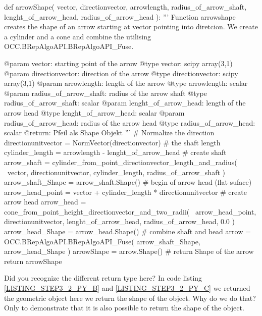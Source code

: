 \begin{python}[moreemph={[4], 46, 48},caption={Step3\_2.py - Function defining an arrow shape object from a point, a direction vector, the arrow length, the radius of the arrow shaft, the length of the arrow head and the radius of the arrow head},label=LISTING_STEP3_2_PY_D]
def arrowShape( vector, 
                directionvector,
                arrowlength,
                radius_of_arrow_shaft,
                lenght_of_arrow_head,
                radius_of_arrow_head ):
    '''
    Function arrowshape creates the shape of an arrow starting at vector
    pointing into diretcion. We create a cylinder and a cone and combine the 
    utilising OCC.BRepAlgoAPI.BRepAlgoAPI_Fuse.

    @param vector: starting point of the arrow
    @type  vector: scipy array(3,1)
    @param directionvector: direction of the arrow
    @type  directionvector: scipy  array(3,1)
    @param arrowlength: length of the arrow
    @type  arrowlength: scalar
    @param radius_of_arrow_shaft: radius of the arrow shaft
    @type  radius_of_arrow_shaft: scalar
    @param lenght_of_arrow_head: length of the arrow head
    @type  lenght_of_arrow_head: scalar
    @param radius_of_arrow_head: radius of the arrow head
    @type  radius_of_arrow_head: scalar
    @return: Pfeil als Shape Objekt
    '''
    # Normalize the direction
    directionunitvector = NormVector(directionvector)
    # the shaft length
    cylinder_length = arrowlength - lenght_of_arrow_head
    # create shaft
    arrow_shaft = cylinder_from_point_directionvector_length_and_radius( \
                                                    vector, 
                                                    directionunitvector,
                                                    cylinder_length,
                                                    radius_of_arrow_shaft ) 
    arrow_shaft_Shape = arrow_shaft.Shape()
    # begin of arrow head (flat suface)
    arrow_head_point = vector + cylinder_length * directionunitvector
    # create arrow head
    arrow_head = cone_from_point_height_directionvector_and_two_radii(  \
                                                    arrow_head_point, 
                                                    directionunitvector,
                                                    lenght_of_arrow_head,
                                                    radius_of_arrow_head,
                                                    0.0 )
    arrow_head_Shape = arrow_head.Shape()
    # combine shaft and head
    arrow = OCC.BRepAlgoAPI.BRepAlgoAPI_Fuse(   arrow_shaft_Shape, 
                                                arrow_head_Shape )       
    arrowShape = arrow.Shape() 
    # return Shape of the arrow
    return arrowShape
\end{python}
Did you recognize the different return type here?
In code listing \ref{LISTING_STEP3_2_PY_B} and \ref{LISTING_STEP3_2_PY_C} we returned the geometric object here we return the shape of the object.
Why do we do that?
Only to demonstrate that it is also possible to return the shape of the object.

